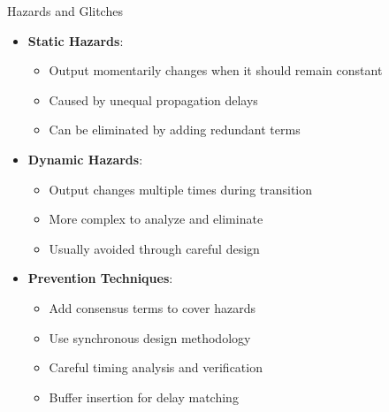 \documentclass[aspectratio=169,11pt]{beamer}
\newcommand{\concept}[1]{\textbf{\color{accentcolor}#1}}
\begin{document}
\begin{frame}{Hazards and Glitches}
\begin{itemize}
\item \concept{Static Hazards}:
\begin{itemize}
\item Output momentarily changes when it should remain constant
\item Caused by unequal propagation delays
\item Can be eliminated by adding redundant terms
\end{itemize}
\vspace{0.5cm}
\item \concept{Dynamic Hazards}:
\begin{itemize}
\item Output changes multiple times during transition
\item More complex to analyze and eliminate
\item Usually avoided through careful design
\end{itemize}
\vspace{0.5cm}
\item \concept{Prevention Techniques}:
\begin{itemize}
\item Add consensus terms to cover hazards
\item Use synchronous design methodology
\item Careful timing analysis and verification
\item Buffer insertion for delay matching
\end{itemize}
\end{itemize}
\end{frame}
\end{document}
